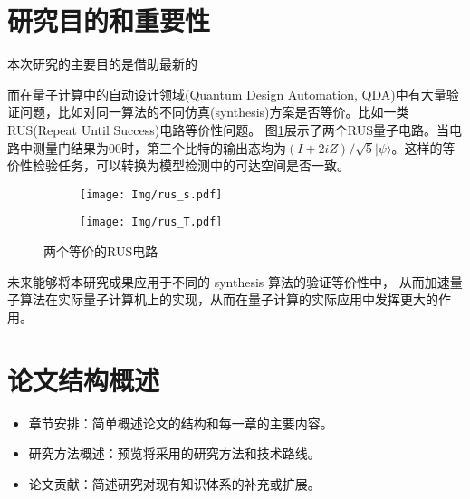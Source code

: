 \section{研究目的和重要性}
本次研究的主要目的是借助最新的

而在量子计算中的自动设计领域(Quantum Design Automation, QDA)中有大量验证问题，比如对同一算法的不同仿真(synthesis)方案是否等价。比如一类RUS(Repeat Until Success)电路等价性问题。
图\ref{fig:rus-equal}展示了两个RUS量子电路。当电路中测量门结果为$00$时，第三个比特的输出态均为$\left(I+2iZ\right)/ \sqrt 5 |\psi\rangle$。这样的等价性检验任务，可以转换为模型检测中的可达空间是否一致。
\begin{figure}[!htbp]
	\centering
	\begin{subfigure}[b]{0.4\textwidth}
        \centering
        \texttt{[image: Img/rus\_s.pdf]}
	\end{subfigure}
	\qquad
	\begin{subfigure}[b]{0.4\textwidth}
        \centering
        \texttt{[image: Img/rus\_T.pdf]}
	\end{subfigure}
	\caption{两个等价的RUS电路\citep{Bocharov_2015}}
	\label{fig:rus-equal}
\end{figure}
未来能够将本研究成果应用于不同的 synthesis 算法的验证等价性中，
从而加速量子算法在实际量子计算机上的实现，从而在量子计算的实际应用中发挥更大的作用。
\section{论文结构概述}
\begin{itemize}
  \item 章节安排：简单概述论文的结构和每一章的主要内容。
  \item 研究方法概述：预览将采用的研究方法和技术路线。
  \item 论文贡献：简述研究对现有知识体系的补充或扩展。
\end{itemize}
